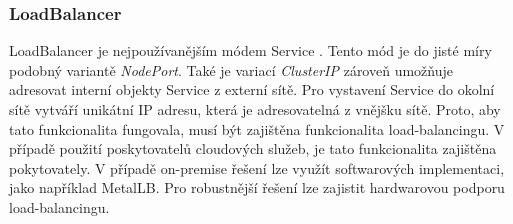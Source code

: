 \subsubsection{LoadBalancer}
LoadBalancer je nejpoužívanějším módem Service \cite{poulton_2022_the}. Tento mód je do jisté míry podobný variantě \textit{NodePort}. Také je variací \textit{ClusterIP} zároveň umožňuje adresovat interní objekty Service z externí sítě. Pro vystavení Service do okolní sítě vytváří unikátní IP adresu, která je adresovatelná z vnějšku sítě. Proto, aby tato funkcionalita fungovala, musí být zajištěna funkcionalita load-balancingu. V případě použití poskytovatelů cloudových služeb, je tato funkcionalita zajištěna pokytovately. V případě on-premise řešení lze využít softwarových implementaci, jako například MetalLB. Pro robustnější řešení lze zajistit hardwarovou podporu load-balancingu. \cite{thekubernetesauthors_2023_service}



